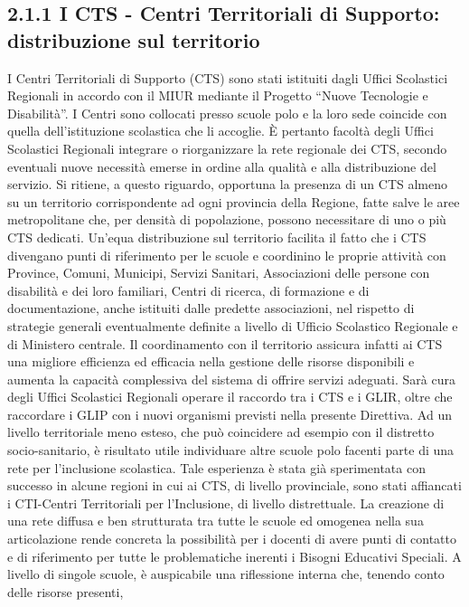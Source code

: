 \subsection*{2.1.1 I CTS - Centri Territoriali di Supporto: distribuzione sul territorio}
I Centri Territoriali di Supporto (CTS) sono stati istituiti dagli Uffici Scolastici Regionali in accordo con il
MIUR mediante il Progetto “Nuove Tecnologie e Disabilità”. I Centri sono collocati presso scuole polo e la
loro sede coincide con quella dell'istituzione scolastica che li accoglie.
È pertanto facoltà degli Uffici Scolastici Regionali integrare o riorganizzare la rete regionale dei CTS, secondo
eventuali nuove necessità emerse in ordine alla qualità e alla distribuzione del servizio.
Si ritiene, a questo riguardo, opportuna la presenza di un CTS almeno su un territorio corrispondente ad ogni
provincia della Regione, fatte salve le aree metropolitane che, per densità di popolazione, possono
necessitare di uno o più CTS dedicati.
Un'equa distribuzione sul territorio facilita il fatto che i CTS divengano punti di riferimento per le scuole e
coordinino le proprie attività con Province, Comuni, Municipi, Servizi Sanitari, Associazioni delle persone
con disabilità e dei loro familiari, Centri di ricerca, di formazione e di documentazione, anche istituiti dalle
predette associazioni, nel rispetto di strategie generali eventualmente definite a livello di Ufficio Scolastico
Regionale e di Ministero centrale. Il coordinamento con il territorio assicura infatti ai CTS una migliore
efficienza ed efficacia nella gestione delle risorse disponibili e aumenta la capacità complessiva del sistema
di offrire servizi adeguati. Sarà cura degli Uffici Scolastici Regionali operare il raccordo tra i CTS e i GLIR,
oltre che raccordare i GLIP con i nuovi organismi previsti nella presente Direttiva.
Ad un livello territoriale meno esteso, che può coincidere ad esempio con il distretto socio-sanitario, è
risultato utile individuare altre scuole polo facenti parte di una rete per l'inclusione scolastica.
Tale esperienza è stata già sperimentata con successo in alcune regioni in cui ai CTS, di livello provinciale,
sono stati affiancati i CTI-Centri Territoriali per l'Inclusione, di livello distrettuale.
La creazione di una rete diffusa e ben strutturata tra tutte le scuole ed omogenea nella sua articolazione rende
concreta la possibilità per i docenti di avere punti di contatto e di riferimento per tutte le problematiche
inerenti i Bisogni Educativi Speciali.
A livello di singole scuole, è auspicabile una riflessione interna che, tenendo conto delle risorse presenti,
